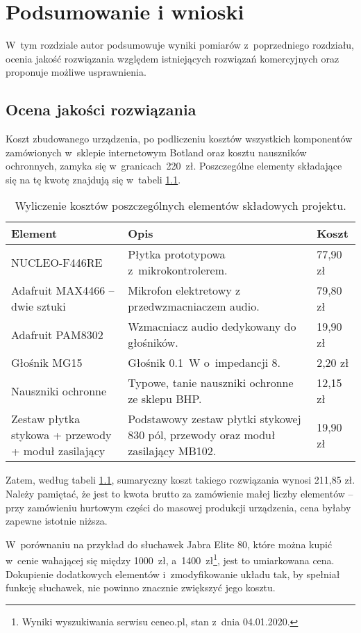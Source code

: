 \chapter{Podsumowanie i wnioski}
\label{cha:wnioski}
W~tym rozdziale autor podsumowuje wyniki pomiarów z~poprzedniego rozdziału, ocenia jakość rozwiązania względem istniejących rozwiązań komercyjnych oraz proponuje możliwe usprawnienia.
\section{Ocena jakości rozwiązania}
Koszt zbudowanego urządzenia, po podliczeniu kosztów wszystkich komponentów zamówionych w~sklepie internetowym Botland oraz kosztu nauszników ochronnych, zamyka się w~granicach~220~zł. Poszczególne elementy składające się na tę kwotę znajdują się w~tabeli \ref{tab:costs}.
\begin{table}[h!]
	\centering
	\caption{Wyliczenie kosztów poszczególnych elementów składowych projektu.}
	\label{tab:costs}
		\begin{tabular}{|p{} | p{} | p{}|}
		\hline 
		Element & Opis & Koszt \\ 
		\hline\hline
		NUCLEO-F446RE & Płytka prototypowa z~mikrokontrolerem. & 77,90 zł \\ 
		\hline
		Adafruit MAX4466 -- dwie sztuki & Mikrofon elektretowy z przedwzmacniaczem audio. & 79,80 zł \\
		\hline
		Adafruit PAM8302 & Wzmacniacz audio dedykowany do głośników. & 19,90 zł \\
		\hline
		Głośnik MG15 & Głośnik \SI{0,1}{\W} o~impedancji \SI{8}{\Omega}. & 2,20 zł \\
		\hline
		Nauszniki ochronne & Typowe, tanie nauszniki ochronne ze sklepu BHP. & 12,15 zł \\
		\hline
		Zestaw płytka stykowa + przewody + moduł zasilający & Podstawowy zestaw płytki stykowej 830 pól, przewody oraz moduł zasilający MB102. & 19,90 zł \\
		\hline
	\end{tabular}
\end{table}

Zatem, według tabeli \ref{tab:costs}, sumaryczny koszt takiego rozwiązania wynosi 211,85 zł. Należy pamiętać, że jest to kwota brutto za zamówienie małej liczby elementów -- przy zamówieniu hurtowym części do masowej produkcji urządzenia, cena byłaby zapewne istotnie niższa.

W~porównaniu na przykład do słuchawek Jabra Elite 80, które można kupić w~cenie wahającej się między 1000~zł, a~1400~zł\footnote{Wyniki wyszukiwania serwisu ceneo.pl, stan z~dnia 04.01.2020.}, jest to umiarkowana cena. Dokupienie dodatkowych elementów i~zmodyfikowanie układu tak, by spełniał funkcję słuchawek, nie powinno znacznie zwiększyć jego kosztu.

